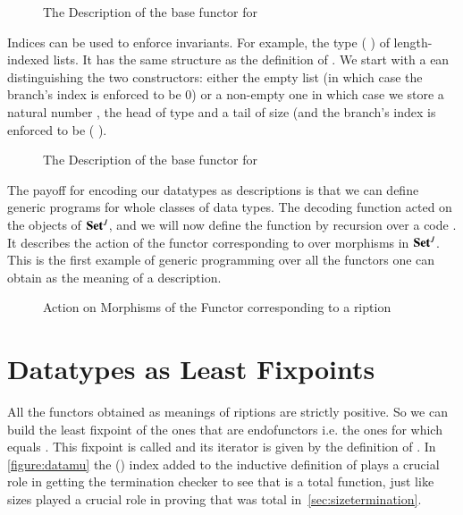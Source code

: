 \begin{figure}[h]
\caption{The Description of the base functor for  }\label{figure:listD}
\end{figure}

Indices can be used to enforce invariants. For example, the type ({  })
of length-indexed lists. It has the same structure as the definition of .
We start with a ean distinguishing the two constructors: either
the empty list (in which case the branch's index is enforced to be $0$) or a
non-empty one in which case we store a natural number , the head of type
 and a tail of size  (and the branch's index is enforced to be
( ).

\begin{figure}[h]
\caption{The Description of the base functor for   }\label{figure:vecD}
\end{figure}

The payoff for encoding our datatypes as descriptions is that we can define
generic programs for whole classes of data types. The decoding function 
acted on the objects of $\mathbf{Set}{}^J$, and we will now define the function  by
recursion over a code . It describes the action of the functor corresponding
to  over morphisms in $\mathbf{Set}{}^J$. This is the first example of generic
programming over all the functors one can obtain as the meaning of a description.

\begin{figure}[h]
\caption{Action on Morphisms of the Functor corresponding to a ription}
\end{figure}

\section{Datatypes as Least Fixpoints}

All the functors obtained as meanings of riptions are strictly positive.
So we can build the least fixpoint of the ones that are endofunctors i.e. the ones
for which  equals . This fixpoint is called  and its iterator is
given by the definition of  . In \cref{figure:datamu} the
 (\cite{DBLP:journals/corr/abs-1012-4896}) index added to the inductive
definition of  plays a crucial role in getting the termination checker to
see that  is a total function, just like sizes played a crucial role in
proving that  was total in~\cref{sec:sizetermination}.

